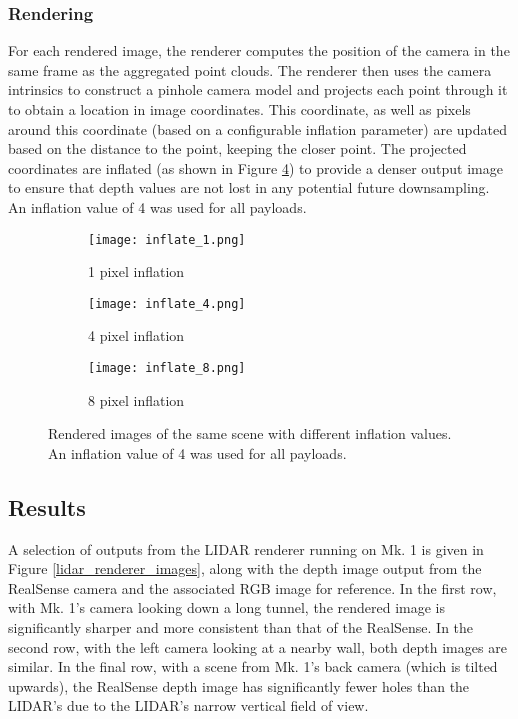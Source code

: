\subsubsection{Rendering}
For each rendered image, the renderer computes the position of the camera in the same frame as the aggregated point clouds. The renderer then uses the camera intrinsics to construct a pinhole camera model and projects each point through it to obtain a location in image coordinates. This coordinate, as well as pixels around this coordinate (based on a configurable inflation parameter) are updated based on the distance to the point, keeping the closer point. The projected coordinates are inflated (as shown in Figure \ref{lidar_inflate}) to provide a denser output image to ensure that depth values are not lost in any potential future downsampling. An inflation value of 4 was used for all payloads.

\begin{figure}
	\centering
	\begin{subfigure}{0.32\textwidth}
		\texttt{[image: inflate\_1.png]}
		\caption{1 pixel inflation}
		\label{inflate_1}
	\end{subfigure}		
	\hfill
	\begin{subfigure}{0.32\textwidth}
		\texttt{[image: inflate\_4.png]}
		\caption{4 pixel inflation}
		\label{inflate_4}		
	\end{subfigure}
	\hfill
	\begin{subfigure}{0.32\textwidth}
		\texttt{[image: inflate\_8.png]}
		\caption{8 pixel inflation}
		\label{inflate_8}
	\end{subfigure}
	\caption[LIDAR renderer inflation values comparison]{Rendered images of the same scene with different inflation values. An inflation value of 4 was used for all payloads.}
	\label{lidar_inflate}
\end{figure}

\subsection{Results}

A selection of outputs from the LIDAR renderer running on Mk. 1 is given in Figure \ref{lidar_renderer_images}, along with the depth image output from the RealSense camera and the associated RGB image for reference. In the first row, with Mk. 1's camera looking down a long tunnel, the rendered image is significantly sharper and more consistent than that of the RealSense. In the second row, with the left camera looking at a nearby wall, both depth images are similar. In the final row, with a scene from Mk. 1's back camera (which is tilted upwards), the RealSense depth image has significantly fewer holes than the LIDAR's due to the LIDAR's narrow vertical field of view. 

